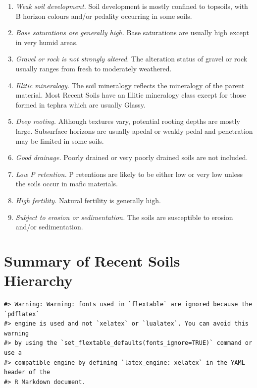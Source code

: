 \documentclass[
  letterpaper,
  DIV=11,
  numbers=noendperiod]{scrreprt}
\providecommand{\tightlist}{%
  \setlength{\itemsep}{0pt}\setlength{\parskip}{0pt}}\usepackage{longtable,booktabs,array}
\begin{document}
\begin{enumerate}
\def\labelenumi{\arabic{enumi}.}
\tightlist
\item
  \emph{Weak soil development.} Soil development is mostly confined to
  topsoils, with B horizon colours and/or pedality occurring in some
  soils.
\item
  \emph{Base saturations are generally high.} Base saturations are
  usually high except in very humid areas.
\item
  \emph{Gravel or rock is not strongly altered.} The alteration status
  of gravel or rock usually ranges from fresh to moderately weathered.
\item
  \emph{Illitic mineralogy.} The soil mineralogy reflects the mineralogy
  of the parent material. Most Recent Soils have an Illitic mineralogy
  class except for those formed in tephra which are usually Glassy.
\item
  \emph{Deep rooting.} Although textures vary, potential rooting depths
  are mostly large. Subsurface horizons are usually apedal or weakly
  pedal and penetration may be limited in some soils.
\item
  \emph{Good drainage.} Poorly drained or very poorly drained soils are
  not included.
\item
  \emph{Low P retention.} P retentions are likely to be either low or
  very low unless the soils occur in mafic materials.
\item
  \emph{High fertility.} Natural fertility is generally high.
\item
  \emph{Subject to erosion or sedimentation.} The soils are susceptible
  to erosion and/or sedimentation.
\end{enumerate}

\hypertarget{sec-sum-R}{%
\section{Summary of Recent Soils Hierarchy}\label{sec-sum-R}}

\begin{verbatim}
#> Warning: Warning: fonts used in `flextable` are ignored because the `pdflatex`
#> engine is used and not `xelatex` or `lualatex`. You can avoid this warning
#> by using the `set_flextable_defaults(fonts_ignore=TRUE)` command or use a
#> compatible engine by defining `latex_engine: xelatex` in the YAML header of the
#> R Markdown document.
\end{verbatim}

\providecommand{\docline}[3]{\noalign{\global\setlength{\arrayrulewidth}{#1}}\arrayrulecolor[HTML]{#2}\cline{#3}}
\end{document}

